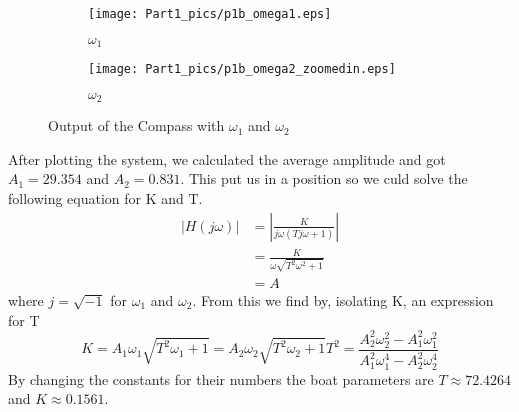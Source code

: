 \begin{figure}[H]
\begin{subfigure}{0.5\textwidth}
    \texttt{[image: Part1\_pics/p1b\_omega1.eps]}
    \caption{$\omega_1$}
\end{subfigure}
\begin{subfigure}{0.5\textwidth}
    \texttt{[image: Part1\_pics/p1b\_omega2\_zoomedin.eps]}
    \caption{$\omega_2$}
\end{subfigure}
\caption{Output of the Compass with $\omega_1$ and $\omega_2$}
\label{fig:p1b}
\end{figure}
After plotting the system, we calculated the average amplitude and got $A_1 = 29.354$ and $A_2 = 0.831$. 
This put us in a position so we culd solve the following equation for K and T.   
\begin{equation} \label{eq:transferfunction}
\begin{split}
    |H(j\omega)| &= \left| \frac{K}{j\omega(Tj\omega + 1)} \right| \\
    &= \frac{K}{\omega \sqrt{T^2 \omega^2 + 1}} \\
    &= A
\end{split}
\end{equation}
where $j = \sqrt{-1}$ for $\omega_1$ and $\omega_2$. From this we find by, isolating K, an expression for T
\begin{subequations}
\begin{equation}
    K = A_1 \omega_1 \sqrt{T^2 \omega_1 + 1} = A_2 \omega_2 \sqrt{T^2 \omega_2 + 1} \label{eq:K_def}
\end{equation}
\begin{equation}
    T^2 = \frac{A_2^2 \omega_2^2 - A_1^2 \omega_1^2}{A_1^2 \omega_1^4 - A_2^2 \omega_2^4} \label{eq:T_def}
\end{equation}
\end{subequations}
By changing the constants for their numbers the boat parameters are $T \approx 72.4264$ and $K \approx 0.1561$.






